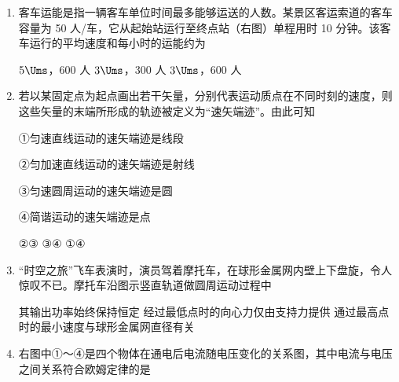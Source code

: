 \documentclass[\gkver]{gaokaozhenti}
\begin{document}
\begin{enumerate}
\item
客车运能是指一辆客车单位时间最多能够运送的人数。某景区客运索道的客车容量为 50 人/车，它从起始站运行至终点站（右图）单程用时 10 分钟。该客车运行的平均速度和每小时的运能约为


{$5\Ums$，600 人}
{$3\Ums$，300 人}
{$3\Ums$，600 人}


\item
若以某固定点为起点画出若干矢量，分别代表运动质点在不同时刻的速度，则这些矢量的末端所形成的轨迹被定义为“速矢端迹”。由此可知

①匀速直线运动的速矢端迹是线段

②匀加速直线运动的速矢端迹是射线

③匀速圆周运动的速矢端迹是圆

④简谐运动的速矢端迹是点

{②③}
{③④}
{①④}


\item
“时空之旅”飞车表演时，演员驾着摩托车，在球形金属网内壁上下盘旋，令人惊叹不已。摩托车沿图示竖直轨道做圆周运动过程中


{其输出功率始终保持恒定}
{经过最低点时的向心力仅由支持力提供}
{通过最高点时的最小速度与球形金属网直径有关}


\item
右图中①～④是四个物体在通电后电流随电压变化的关系图，其中电流与电压之间关系符合欧姆定律的是


\end{enumerate}
\end{document}
